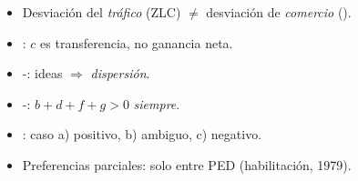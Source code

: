 \documentclass{article}
\begin{document}
\begin{columnas}
\begin{trampa}
\begin{itemize}
\item Desviación del \emph{tráfico} (ZLC) $\neq$ desviación de \emph{comercio} ().
\item {}: $c$ es transferencia, no ganancia neta.
\item {}-: ideas $\Rightarrow$ \emph{dispersión}.
\item {}-: $b+d+f+g>0$ \emph{siempre}.
\item {}: caso a) positivo, b) ambiguo, c) negativo.
\item Preferencias parciales: solo entre PED (habilitación, 1979).
\end{itemize}
\end{trampa}

\end{columnas}
\end{document}

